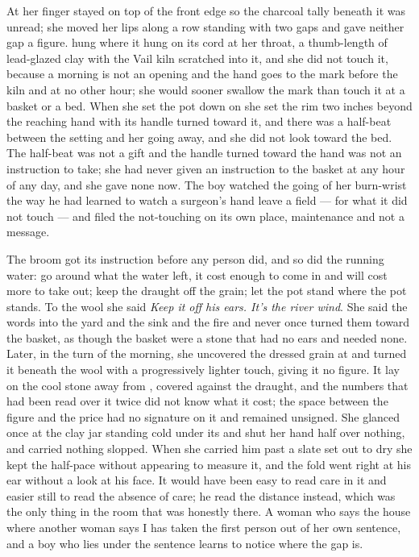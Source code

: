 At  her finger stayed on top of the front edge so the charcoal tally beneath it was unread; she moved her lips along a row standing with two gaps and gave neither gap a figure.  hung where it hung on its cord at her throat, a thumb-length of lead-glazed clay with the Vail kiln scratched into it, and she did not touch it, because a morning is not an opening and the hand goes to the mark before the kiln and at no other hour; she would sooner swallow the mark than touch it at a basket or a bed. When she set the pot down on  she set the rim two inches beyond the reaching hand with its handle turned toward it, and there was a half-beat between the setting and her going away, and she did not look toward the bed. The half-beat was not a gift and the handle turned toward the hand was not an instruction to take; she had never given an instruction to the basket at any hour of any day, and she gave none now. The boy watched the going of her burn-wrist the way he had learned to watch a surgeon's hand leave a field --- for what it did not touch --- and filed the not-touching on its own place, maintenance and not a message.

The broom got its instruction before any person did, and so did the running water: go around what the water left, it cost enough to come in and will cost more to take out; keep the draught off the grain; let the pot stand where the pot stands. To the wool she said \emph{Keep it off his ears. It's the river wind}. She said the words into the yard and the sink and the fire and never once turned them toward the basket, as though the basket were a stone that had no ears and needed none. Later, in the turn of the morning, she uncovered the dressed grain at  and turned it beneath the wool with a progressively lighter touch, giving it no figure. It lay on the cool stone away from , covered against the draught, and the numbers that had been read over it twice did not know what it cost; the space between the figure and the price had no signature on it and remained unsigned. She glanced once at the clay jar standing cold under its  and shut her hand half over nothing, and carried nothing slopped. When she carried him past a slate set out to dry she kept the half-pace without appearing to measure it, and the fold went right at his ear without a look at his face. It would have been easy to read care in it and easier still to read the absence of care; he read the distance instead, which was the only thing in the room that was honestly there. A woman who says the house where another woman says I has taken the first person out of her own sentence, and a boy who lies under the sentence learns to notice where the gap is.

